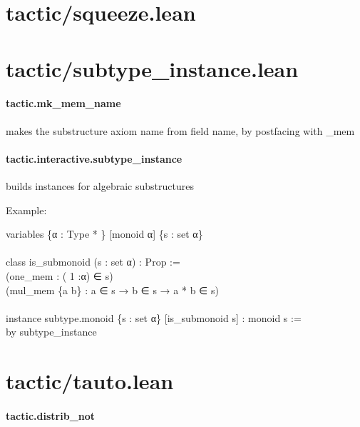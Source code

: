 \documentclass{article}
\begin{document}
\section{tactic/squeeze.lean}\section{tactic/subtype\_instance.lean}\paragraph{tactic.mk\_mem\_name}
\par
makes the substructure axiom name from field name, by postfacing with 
\colorbox[RGB]{253,246,227}{{{{\color[RGB]{101, 123, 131} \_mem }}}}\paragraph{tactic.interactive.subtype\_instance}
\par
builds instances for algebraic substructures
\par
Example:
\\
\colorbox[RGB]{253,246,227}{\parbox{4.5in}{{{{\color[RGB]{133, 153, 0} variables }}}{{{\color[RGB]{101, 123, 131}  \{α :  }}}{{{\color[RGB]{38, 139, 210} Type }}}{{{\color[RGB]{181, 137, 0} * }}}{{{\color[RGB]{101, 123, 131} \} {[}monoid α{]} \{s : set α\}
 }}}\\
{{{\color[RGB]{101, 123, 131} 
 }}}\\
{{{\color[RGB]{133, 153, 0} class }}}{{{\color[RGB]{101, 123, 131}   }}}{{{\color[RGB]{211, 54, 130} is\_submonoid }}}{{{\color[RGB]{101, 123, 131}   }}}{{{\color[RGB]{101, 123, 131} (s : set α) :  }}}{{{\color[RGB]{38, 139, 210} Prop }}}{{{\color[RGB]{101, 123, 131}   }}}{{{\color[RGB]{181, 137, 0} := }}}{{{\color[RGB]{101, 123, 131} 
 }}}\\
{{{\color[RGB]{101, 123, 131} (one\_mem : ( }}}{{{\color[RGB]{108, 113, 196} 1 }}}{{{\color[RGB]{101, 123, 131} :α) ∈ s)
 }}}\\
{{{\color[RGB]{101, 123, 131} (mul\_mem \{a b\} : a ∈ s  }}}{{{\color[RGB]{133, 153, 0} → }}}{{{\color[RGB]{101, 123, 131}  b ∈ s  }}}{{{\color[RGB]{133, 153, 0} → }}}{{{\color[RGB]{101, 123, 131}  a  }}}{{{\color[RGB]{181, 137, 0} * }}}{{{\color[RGB]{101, 123, 131}  b ∈ s)
 }}}\\
{{{\color[RGB]{101, 123, 131} 
 }}}\\
{{{\color[RGB]{133, 153, 0} instance }}}{{{\color[RGB]{101, 123, 131}   }}}{{{\color[RGB]{211, 54, 130} subtype.monoid }}}{{{\color[RGB]{101, 123, 131}   }}}{{{\color[RGB]{101, 123, 131} \{s : set α\} {[}is\_submonoid s{]} : monoid s  }}}{{{\color[RGB]{181, 137, 0} := }}}{{{\color[RGB]{101, 123, 131} 
 }}}\\
{{{\color[RGB]{133, 153, 0} by }}}{{{\color[RGB]{101, 123, 131}  subtype\_instance
 }}}\\

}}\section{tactic/tauto.lean}\paragraph{tactic.distrib\_not}
\end{document}
